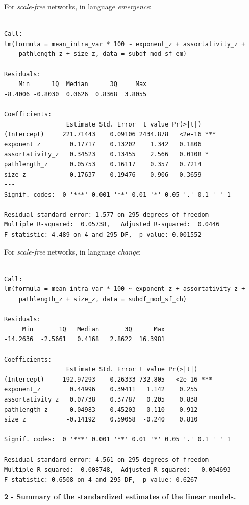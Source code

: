 \documentclass[
]{article}
\begin{document}
For \emph{scale-free} networks, in language \emph{emergence}:

\begin{verbatim}

Call:
lm(formula = mean_intra_var * 100 ~ exponent_z + assortativity_z + 
    pathlength_z + size_z, data = subdf_mod_sf_em)

Residuals:
    Min      1Q  Median      3Q     Max 
-8.4006 -0.8030  0.0626  0.8368  3.8055 

Coefficients:
                 Estimate Std. Error  t value Pr(>|t|)    
(Intercept)     221.71443    0.09106 2434.878   <2e-16 ***
exponent_z        0.17717    0.13202    1.342   0.1806    
assortativity_z   0.34523    0.13455    2.566   0.0108 *  
pathlength_z      0.05753    0.16117    0.357   0.7214    
size_z           -0.17637    0.19476   -0.906   0.3659    
---
Signif. codes:  0 '***' 0.001 '**' 0.01 '*' 0.05 '.' 0.1 ' ' 1

Residual standard error: 1.577 on 295 degrees of freedom
Multiple R-squared:  0.05738,   Adjusted R-squared:  0.0446 
F-statistic: 4.489 on 4 and 295 DF,  p-value: 0.001552
\end{verbatim}

For \emph{scale-free} networks, in language \emph{change}:

\begin{verbatim}

Call:
lm(formula = mean_intra_var * 100 ~ exponent_z + assortativity_z + 
    pathlength_z + size_z, data = subdf_mod_sf_ch)

Residuals:
     Min       1Q   Median       3Q      Max 
-14.2636  -2.5661   0.4168   2.8622  16.3981 

Coefficients:
                 Estimate Std. Error t value Pr(>|t|)    
(Intercept)     192.97293    0.26333 732.805   <2e-16 ***
exponent_z        0.44996    0.39411   1.142    0.255    
assortativity_z   0.07738    0.37787   0.205    0.838    
pathlength_z      0.04983    0.45203   0.110    0.912    
size_z           -0.14192    0.59058  -0.240    0.810    
---
Signif. codes:  0 '***' 0.001 '**' 0.01 '*' 0.05 '.' 0.1 ' ' 1

Residual standard error: 4.561 on 295 degrees of freedom
Multiple R-squared:  0.008748,  Adjusted R-squared:  -0.004693 
F-statistic: 0.6508 on 4 and 295 DF,  p-value: 0.6267
\end{verbatim}

\textbf{2 - Summary of the standardized estimates of the linear models.}
\end{document}
